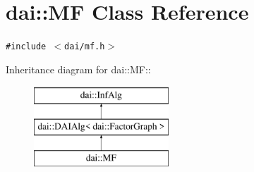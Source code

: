 \hypertarget{classdai_1_1MF}{
\section{dai::MF Class Reference}
\label{classdai_1_1MF}
}
{\tt \#include $<$dai/mf.h$>$}

Inheritance diagram for dai::MF::\begin{figure}[H]
\begin{center}
\leavevmode
\includegraphics[height=3cm]{classdai_1_1MF}
\end{center}
\end{figure}


